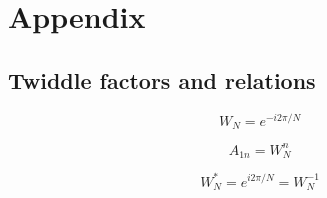 
\chapter*{Appendix}\label{ch:appendix}

\section*{Twiddle factors and relations}\label{sec:twiddle-factors-and-relations}

\begin{equation}\label{eq:twiddle-factor-appendix}
    W_N = e^{- i 2 \pi / N}
\end{equation}

\begin{equation}\label{eq:twiddle-factor-appendix-2}
    A_{1 n} = W^n_N
\end{equation}

\begin{equation}\label{eq:twiddle-factor-appendix-3}
    W^*_N = e^{i 2 \pi / N} = W^{-1}_N
\end{equation}









